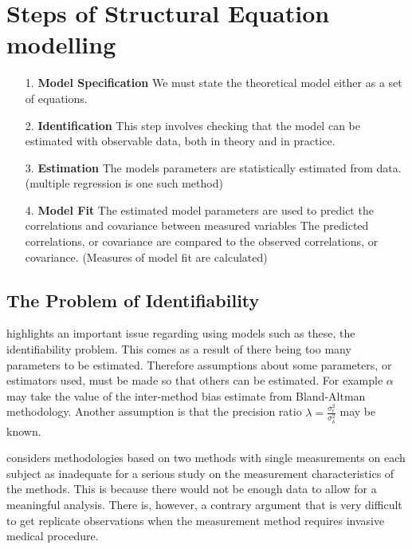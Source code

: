 \documentclass[Main.tex]{subfiles}
\begin{document}
	
	\section{Steps of Structural Equation modelling}
	
	\begin{itemize}
		\item[1.] \textbf{Model Specification}
		We must state the theoretical model either as a set of equations.
		
		\item[2.] \textbf{Identification }
		This step involves checking that the model can be estimated with observable data, both in theory and in practice.
		
		\item[3.] \textbf{Estimation}
		The models parameters are statistically estimated from data. (multiple regression is one such method)
		
		\item[4.] \textbf{Model Fit}
		The estimated model parameters are used to predict the correlations and covariance between measured variables 
		The predicted correlations, or covariance are compared to the observed correlations, or covariance. (Measures of model fit are calculated)
	\end{itemize}
	
	


\subsection{The Problem of Identifiability}



\citet{DunnSEME} highlights an important issue regarding using
models such as these, the identifiability problem. This comes as a
result of there being too many parameters to be estimated.
Therefore assumptions about some parameters, or estimators used,
must be made so that others can be estimated. For example $\alpha$
may take the value of the inter-method bias estimate from
Bland-Altman methodology. Another assumption is that the precision
ratio $\lambda=\frac{\sigma^{2}_{\epsilon}}{\sigma^{2}_{\delta}}$
may be known.


\citet{DunnSEME} considers methodologies based on two methods with single measurements on each subject as inadequate for a serious study
on the measurement characteristics of the methods. This is because there would not be enough data to allow for a meaningful analysis.
There is, however, a contrary argument that is very difficult to get replicate
observations when the measurement method requires invasive medical procedure.
\end{document}
